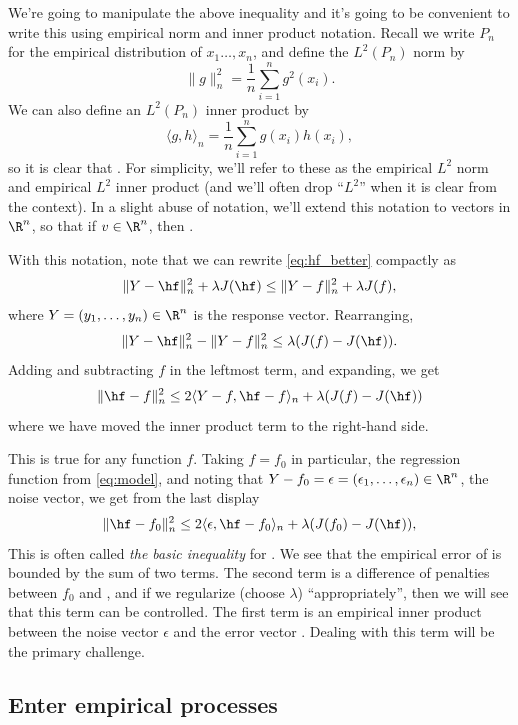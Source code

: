 \documentclass{article}
\begin{document}
We're going to manipulate the above inequality and it's going to be convenient
to write this using empirical norm and inner product notation. Recall we write
$P_n$ for the empirical distribution of $x_1\dots,x_n$, and define the
$L^2(P_n)$ norm by  
\[
\|g\|_n^2 = \frac{1}{n} \sum_{i=1}^n g^2(x_i).
\]
We can also define an $L^2(P_n)$ inner product by 
\[
\langle g, h \rangle_n = \frac{1}{n} \sum_{i=1}^n g(x_i) h(x_i),
\]
so it is clear that . For
simplicity, we'll refer to these as the empirical $L^2$ norm and empirical $L^2$
inner product (and we'll often drop ``$L^2$'' when it is clear from the
context). In a slight abuse of notation, we'll extend this notation to vectors
in $\R^n$, so that if $v \in \R^n$, then .  

With this notation, note that we can rewrite \eqref{eq:hf_better} compactly as 
\[
\|Y - \hf\|_n^2 + \lambda J(\hf) \leq \|Y - f\|_n^2 + \lambda J(f),
\]
where $Y = (y_1,\dots,y_n) \in \R^n$ is the response vector. Rearranging,
\[
\|Y - \hf\|_n^2 - \|Y - f\|_n^2 \leq \lambda (J(f) - J(\hf)).
\]
Adding and subtracting $f$ in the leftmost term, and expanding, we get 
\[
\|\hf - f\|_n^2 \leq 2 \langle Y-f, \hf-f \rangle_n + \lambda (J(f) - J(\hf))
\]
where we have moved the inner product term to the right-hand side. 

This is true for any function $f$. Taking $f = f_0$ in particular, the
regression function from \eqref{eq:model}, and noting that $Y-f_0 = \epsilon = 
(\epsilon_1,\dots,\epsilon_n) \in \R^n$, the noise vector, we get from the last
display 
\begin{equation}
\label{eq:basic_ineq}
\|\hf - f_0\|_n^2 \leq 2 \langle \epsilon, \hf-f_0 \rangle_n + \lambda (J(f_0) -
J(\hf)), 
\end{equation}
This is often called \emph{the basic inequality} for \smash{$\hf$}. We see that
the empirical error of \smash{$\hf$} is bounded by the sum of two terms. The
second term is a difference of penalties between $f_0$ and \smash{$\hf$}, and if
we regularize (choose $\lambda$) ``appropriately'', then we will see that this
term can be controlled. The first term is an empirical inner product between the
noise vector $\epsilon$ and the error vector . Dealing with
this term will be the primary challenge.  

\subsection{Enter empirical processes}
\end{document}
